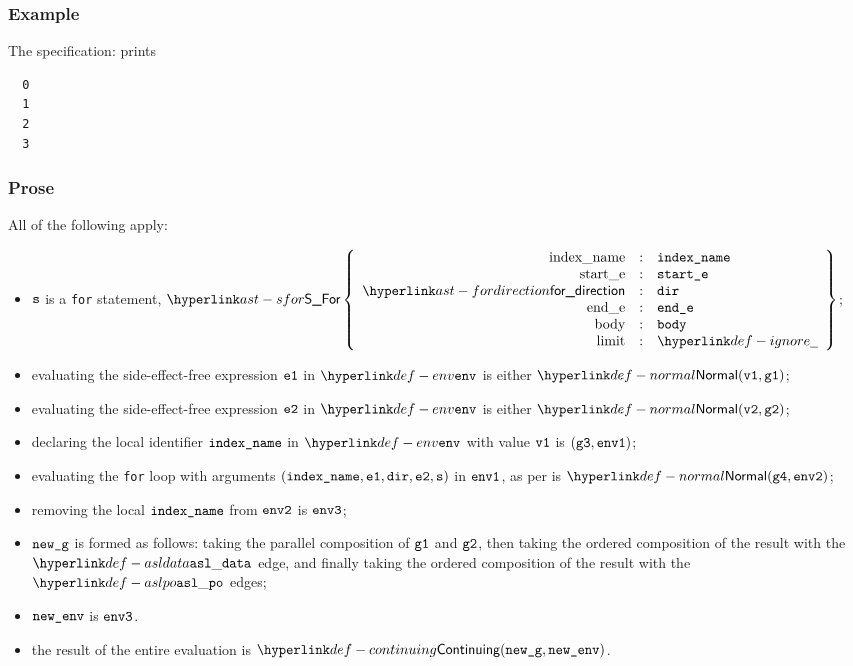 \subsubsection{Example}
The specification:
prints
\begin{Verbatim}
  0
  1
  2
  3
\end{Verbatim}

\subsubsection{Prose}
All of the following apply:
\begin{itemize}
  \item $\texttt{s}$ is a \texttt{for} statement, $\SFor\left\{\begin{array}{rcl}
    \Forindexname &:& \vindexname\\
    \Forstarte &:& \vstarte\\
    \fordirection &:& \vdir\\
    \Forende &:& \vende\\
    \Forbody &:& \vbody\\
    \Forlimit &:& \Ignore
  \end{array}\right\}$;
  \item evaluating the side-effect-free expression $\texttt{e1}$ in $\env$ is either
  $\Normal(\vvone, \vgone)$\ProseOrError;
  \item evaluating the side-effect-free expression $\texttt{e2}$ in $\env$ is either
  $\Normal(\vvtwo, \vgtwo)$\ProseOrError;
  \item declaring the local identifier $\texttt{index\_name}$ in $\env$ with value $\texttt{v1}$ is $(\texttt{g3}, \texttt{env1})$;
  \item evaluating the \texttt{for} loop with arguments $(\texttt{index\_name}, \texttt{e1}, \texttt{dir}, \texttt{e2}, \texttt{s})$ in $\texttt{env1}$,
  as per  is $\Normal(\vgfour, \envtwo)$\ProseOrAbnormal;
  \item removing the local $\texttt{index\_name}$ from $\texttt{env2}$ is $\texttt{env3}$;
  \item $\texttt{new\_g}$ is formed as follows: taking the parallel composition of $\texttt{g1}$ and $\texttt{g2}$,
  then taking the ordered composition of the result with the $\asldata$ edge,
  and finally taking the ordered composition of the result with the $\aslpo$ edges;
  \item $\texttt{new\_env}$ is $\texttt{env3}$.
  \item the result of the entire evaluation is $\Continuing(\newg, \newenv)$.
\end{itemize}
